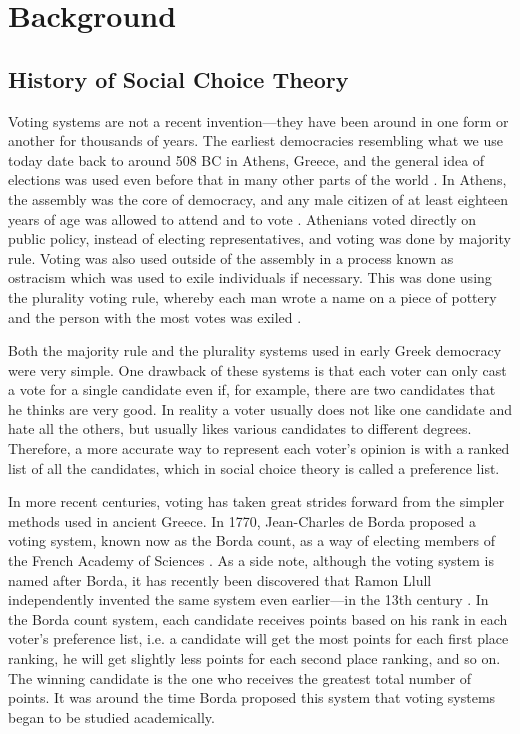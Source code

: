
\chapter{Background}

\section{History of Social Choice Theory}

	Voting systems are not a recent invention---they have been around in one form or another for thousands of years. The earliest democracies resembling what we use today date back to around 508 BC in Athens, Greece, and the general idea of elections was used even before that in many other parts of the world \cite{democracybritannica}. In Athens, the assembly was the core of democracy, and any male citizen of at least eighteen years of age was allowed to attend and to vote \cite{heinemann1952}. Athenians voted directly on public policy, instead of electing representatives, and voting was done by majority rule. Voting was also used outside of the assembly in a process known as ostracism which was used to exile individuals if necessary. This was done using the plurality voting rule, whereby each man wrote a name on a piece of pottery and the person with the most votes was exiled \cite{oturnbull}.

	Both the majority rule and the plurality systems used in early Greek democracy were very simple. One drawback of these systems is that each voter can only cast a vote for a single candidate even if, for example, there are two candidates that he thinks are very good. In reality a voter usually does not like one candidate and hate all the others, but usually likes various candidates to different degrees. Therefore, a more accurate way to represent each voter's opinion is with a ranked list of all the candidates, which in social choice theory is called a preference list.

	In more recent centuries, voting has taken great strides forward from the simpler methods used in ancient Greece. In 1770, Jean-Charles de Borda proposed a voting system, known now as the Borda count, as a way of electing members of the French Academy of Sciences \cite{borda1781mémoire}. As a side note, although the voting system is named after Borda, it has recently been discovered that Ramon Llull independently invented the same system even earlier---in the 13th century \cite{hägele2001llull}. In the Borda count system, each candidate receives points based on his rank in each voter's preference list, i.e. a candidate will get the most points for each first place ranking, he will get slightly less points for each second place ranking, and so on. The winning candidate is the one who receives the greatest total number of points. It was around the time Borda proposed this system that voting systems began to be studied academically.

